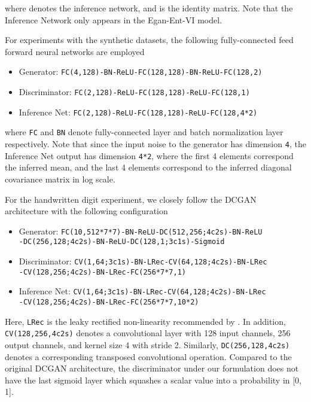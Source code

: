 \documentclass[a4paper]{article}
\begin{document}
where  denotes the inference network, and  is the identity matrix.
Note that the Inference Network only appears in the Egan-Ent-VI model.

For experiments with the synthetic datasets, the following fully-connected feed forward neural networks are employed 
{\footnotesize
\begin{itemize}[leftmargin=16pt,labelindent=16pt]
\item Generator: \texttt{FC(4,128)-BN-ReLU-FC(128,128)-BN-ReLU-FC(128,2)}
\item Discriminator: \texttt{FC(2,128)-ReLU-FC(128,128)-ReLU-FC(128,1)}
\item Inference Net: \texttt{FC(2,128)-ReLU-FC(128,128)-ReLU-FC(128,4*2)}
\end{itemize}}
where \texttt{FC} and \texttt{BN} denote fully-connected layer and batch normalization layer respectively.
Note that since the input noise to the generator has dimension \texttt{4}, the Inference Net output has dimension \texttt{4*2}, where the first 4 elements correspond the inferred mean, and the last 4 elements correspond to the inferred diagonal covariance matrix in log scale.

For the handwritten digit experiment, we closely follow the DCGAN~\citep{radford2015unsupervised} architecture with the following configuration
{\footnotesize
\begin{itemize}[leftmargin=16pt,labelindent=16pt]
\item Generator: \texttt{FC(10,512*7*7)-BN-ReLU-DC(512,256;4c2s)-BN-ReLU}\\ 
\texttt{-DC(256,128;4c2s)-BN-ReLU-DC(128,1;3c1s)-Sigmoid}
\item Discriminator: \texttt{CV(1,64;3c1s)-BN-LRec-CV(64,128;4c2s)-BN-LRec}\\ 
\texttt{-CV(128,256;4c2s)-BN-LRec-FC(256*7*7,1)}
\item Inference Net: \texttt{CV(1,64;3c1s)-BN-LRec-CV(64,128;4c2s)-BN-LRec}\\ 
\texttt{-CV(128,256;4c2s)-BN-LRec-FC(256*7*7,10*2)}
\end{itemize}}
Here, \texttt{LRec} is the leaky rectified non-linearity recommended by \citet{radford2015unsupervised}. 
In addition, \texttt{CV(128,256,4c2s)} denotes a convolutional layer with 128 input channels, 256 output channels, and kernel size 4 with stride 2. Similarly, \texttt{DC(256,128,4c2s)} denotes a corresponding transposed convolutional operation. 
Compared to the original DCGAN architecture, the discriminator under our formulation does not have the last sigmoid layer which squashes a scalar value into a probability in [0, 1]. 
\end{document}
